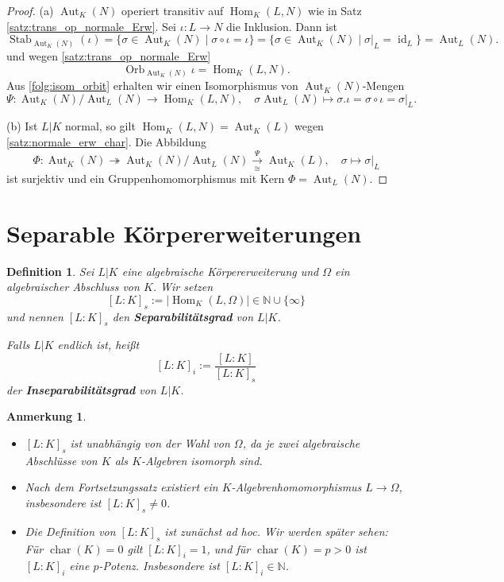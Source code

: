 \documentclass[a4paper, twoside, 11pt, ngerman]{report}
\newcommand{\NN}{\mathds N}
\DeclareMathOperator{\Aut}{Aut}
\DeclareMathOperator{\charact}{char}
\DeclareMathOperator{\Hom}{Hom}
\DeclareMathOperator{\ident}{id}
\DeclareMathOperator{\Orb}{Orb}
\DeclareMathOperator{\Stab}{Stab}
\theoremstyle{definistyle}
\newtheorem{defini}[satz]{Definition}
\newtheorem{anm}[satz]{Anmerkung}
\theoremstyle{remark}
\newcommand{\defn}[1]{\textit{\bfseries #1}}
\begin{document}
\begin{proof}
(a) $\Aut_K(N)$ operiert transitiv auf $\Hom_K(L,N)$ wie in Satz \ref{satz:trans_op_normale_Erw}.  
Sei $\iota\colon L \to N$ die Inklusion. Dann ist
\[
\Stab_{\Aut_K(N)}(\iota) = \{\sigma \in \Aut_K(N) \mid \sigma \circ \iota = \iota\} 
= \{\sigma \in \Aut_K(N) \mid \sigma|_L=\ident_L\} = \Aut_L(N).
\]
und wegen \ref{satz:trans_op_normale_Erw}
\[
\Orb_{\Aut_K(N)}\iota=\Hom_K(L,N).
\]
Aus \ref{folg:isom_orbit} erhalten wir einen Isomorphismus von $\Aut_K(N)$-Mengen
\[
\Psi\colon\Aut_K(N)/\Aut_L(N) \to \Hom_K(L,N), \quad \sigma \Aut_L(N)\mapsto \sigma.\iota=\sigma \circ \iota=\sigma|_L.
\]

(b) Ist $L|K$ normal, so gilt $\Hom_K(L,N) = \Aut_K(L)$ wegen \ref{satz:normale_erw_char}.  
Die Abbildung
\[
\Phi: \Aut_K(N) \twoheadrightarrow \Aut_K(N)/\Aut_L(N) \xrightarrow[\cong]{\Psi} \Aut_K(L), \quad \sigma \mapsto \sigma|_L
\]
ist surjektiv und ein Gruppenhomomorphismus mit Kern $\Phi = \Aut_L(N)$.
\end{proof}

\section{Separable Körpererweiterungen}

\begin{defini}\label{def:separabilitaetsgrad}
Sei $L|K$ eine algebraische Körpererweiterung und $\Omega$ ein algebraischer Abschluss von $K$.  
Wir setzen
\[
[L:K]_s := |\Hom_K(L,\Omega)| \in \NN \cup \{\infty\}
\]
und nennen $[L:K]_s$ den \defn{Separabilitätsgrad} von $L|K$.

Falls $L|K$ endlich ist, heißt
\[
[L:K]_i :=\frac{[L:K]}{[L:K]_s}
\]
der \defn{Inseparabilitätsgrad} von $L|K$.
\end{defini}

\begin{anm}\label{anm:separabilitaetsgrad}
\begin{itemize}
\item $[L:K]_s$ ist unabhängig von der Wahl von $\Omega$, da je zwei algebraische Abschlüsse von $K$ als $K$-Algebren isomorph sind.
\item Nach dem Fortsetzungssatz existiert ein $K$-Algebrenhomomorphismus $L \to \Omega$, insbesondere ist $[L:K]_s \neq 0$.
\item Die Definition von $[L:K]_s$ ist zunächst ad hoc. Wir werden später sehen: Für $\charact(K)=0$ gilt $[L:K]_i = 1$, und für $\charact(K)=p>0$ ist $[L:K]_i$ eine $p$-Potenz. Insbesondere ist $[L:K]_i \in \NN$.
\end{itemize}
\end{anm}
\end{document}
